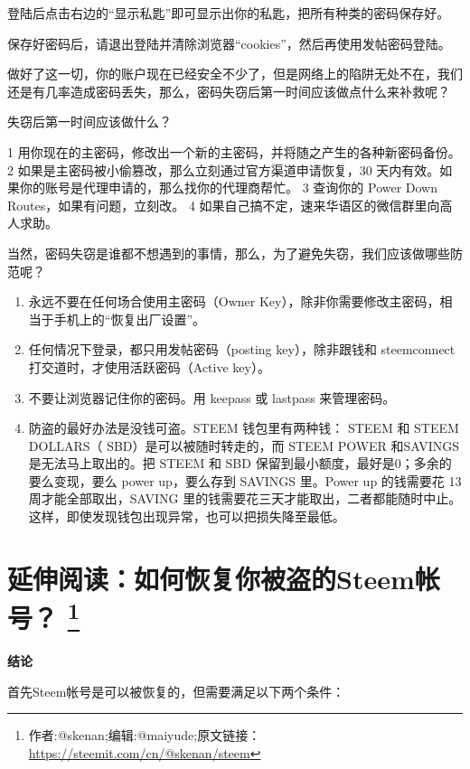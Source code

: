 \documentclass[]{ctexbook}
\providecommand{\tightlist}{%
  \setlength{\itemsep}{0pt}\setlength{\parskip}{0pt}}
\begin{document}
登陆后点击右边的``显示私匙''即可显示出你的私匙，把所有种类的密码保存好。

保存好密码后，请退出登陆并清除浏览器``cookies''，然后再使用发帖密码登陆。

做好了这一切，你的账户现在已经安全不少了，但是网络上的陷阱无处不在，我们还是有几率造成密码丢失，那么，密码失窃后第一时间应该做点什么来补救呢？

失窃后第一时间应该做什么？

1 用你现在的主密码，修改出一个新的主密码，并将随之产生的各种新密码备份。
2 如果是主密码被小偷篡改，那么立刻通过官方渠道申请恢复，30 天内有效。如果你的账号是代理申请的，那么找你的代理商帮忙。
3 查询你的 Power Down Routes，如果有问题，立刻改。
4 如果自己搞不定，速来华语区的微信群里向高人求助。

当然，密码失窃是谁都不想遇到的事情，那么，为了避免失窃，我们应该做哪些防范呢？

\begin{enumerate}
\def\labelenumi{\arabic{enumi}.}
\tightlist
\item
  永远不要在任何场合使用主密码（Owner Key），除非你需要修改主密码，相当于手机上的``恢复出厂设置''。
\item
  任何情况下登录，都只用发帖密码（posting key），除非跟钱和 steemconnect 打交道时，才使用活跃密码（Active key）。
\item
  不要让浏览器记住你的密码。用 keepass 或 lastpass 来管理密码。
\item
  防盗的最好办法是没钱可盗。STEEM 钱包里有两种钱： STEEM 和 STEEM DOLLARS（ SBD）是可以被随时转走的，而 STEEM POWER 和SAVINGS 是无法马上取出的。把 STEEM 和 SBD 保留到最小额度，最好是0；多余的要么变现，要么 power up，要么存到 SAVINGS 里。Power up 的钱需要花 13 周才能全部取出，SAVING 里的钱需要花三天才能取出，二者都能随时中止。这样，即使发现钱包出现异常，也可以把损失降至最低。
\end{enumerate}

\hypertarget{how-to-recover-your-key}{%
\section[延伸阅读：如何恢复你被盗的Steem帐号？ ]{\texorpdfstring{延伸阅读：如何恢复你被盗的Steem帐号？ \footnote{作者:@skenan;编辑:@maiyude;原文链接：\url{https://steemit.com/cn/@skenan/steem}}}{延伸阅读：如何恢复你被盗的Steem帐号？ }}\label{how-to-recover-your-key}}

\textbf{结论}

首先Steem帐号是可以被恢复的，但需要满足以下两个条件：
\end{document}
